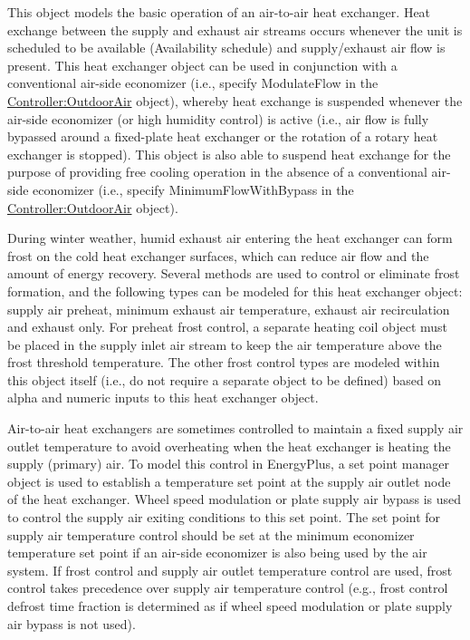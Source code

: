 This object models the basic operation of an air-to-air heat exchanger. Heat exchange between the supply and exhaust air streams occurs whenever the unit is scheduled to be available (Availability schedule) and supply/exhaust air flow is present. This heat exchanger object can be used in conjunction with a conventional air-side economizer (i.e., specify ModulateFlow in the \hyperref[controlleroutdoorair]{Controller:OutdoorAir} object), whereby heat exchange is suspended whenever the air-side economizer (or high humidity control) is active (i.e., air flow is fully bypassed around a fixed-plate heat exchanger or the rotation of a rotary heat exchanger is stopped). This object is also able to suspend heat exchange for the purpose of providing free cooling operation in the absence of a conventional air-side economizer (i.e., specify MinimumFlowWithBypass in the \hyperref[controlleroutdoorair]{Controller:OutdoorAir} object).

During winter weather, humid exhaust air entering the heat exchanger can form frost on the cold heat exchanger surfaces, which can reduce air flow and the amount of energy recovery. Several methods are used to control or eliminate frost formation, and the following types can be modeled for this heat exchanger object: supply air preheat, minimum exhaust air temperature, exhaust air recirculation and exhaust only. For preheat frost control, a separate heating coil object must be placed in the supply inlet air stream to keep the air temperature above the frost threshold temperature. The other frost control types are modeled within this object itself (i.e., do not require a separate object to be defined) based on alpha and numeric inputs to this heat exchanger object.

Air-to-air heat exchangers are sometimes controlled to maintain a fixed supply air outlet temperature to avoid overheating when the heat exchanger is heating the supply (primary) air. To model this control in EnergyPlus, a set point manager object is used to establish a temperature set point at the supply air outlet node of the heat exchanger. Wheel speed modulation or plate supply air bypass is used to control the supply air exiting conditions to this set point. The set point for supply air temperature control should be set at the minimum economizer temperature set point if an air-side economizer is also being used by the air system. If frost control and supply air outlet temperature control are used, frost control takes precedence over supply air temperature control (e.g., frost control defrost time fraction is determined as if wheel speed modulation or plate supply air bypass is not used).

